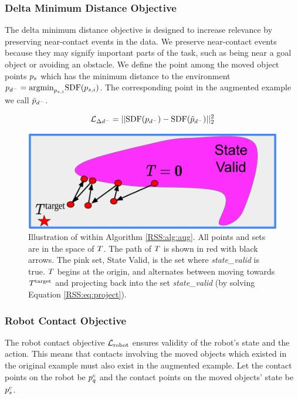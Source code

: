 \subsubsection{Delta Minimum Distance Objective}
The delta minimum distance objective is designed to increase relevance by preserving near-contact events in the data. We preserve near-contact events because they may signify important parts of the task, such as being near a goal object or avoiding an obstacle. We define the point among the moved object points $p_s$ which has the minimum distance to the environment $p_{d^-}=\mathrm{argmin}_{p_{s,i}}\mathrm{SDF}(p_{s,i})$. The corresponding point in the augmented example we call $\Tilde{p}_{d^-}$.

\begin{equation}
\mathcal{L}_{\Delta{d^-}} = ||\mathrm{SDF}(p_{d^-})-\mathrm{SDF}(\Tilde{p}_{d^-})||^2_2
\end{equation}


\begin{figure}
    \centering
    \includegraphics[width=0.5\linewidth]{Chap3/images/step_project.png}
    \caption{Illustration of \augState{} within Algorithm \ref{RSS:alg:aug}. All points and sets are in the space of $T$. The path of $T$ is shown in red with black arrows. The pink set, State Valid, is the set where \textit{state\_valid} is true. $T$ begins at the origin, and alternates between moving towards $T^\text{target}$ and projecting back into the set \textit{state\_valid} (by solving Equation \eqref{RSS:eq:project}).}
    \label{RSS:fig:step_project}
\end{figure}

\subsubsection{Robot Contact Objective}

The robot contact objective $\mathcal{L}_\text{robot}$ ensures validity of the robot's state and the action. This means that contacts involving the moved objects which existed in the original example must also exist in the augmented example. Let the contact points on the robot be $p^c_{q}$ and the contact points on the moved objects' state be $p^c_{s}$.

